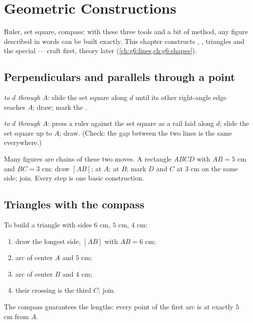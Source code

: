 \chapter{Geometric Constructions}\label{ch:g5:geometry}

Ruler, set square, compass: with these three tools and a bit of
method, any figure described in words can be built exactly. This
chapter constructs , , triangles and the
special  --- craft first, theory later
(\cref{ch:g6:lines,ch:g6:shapes}).

\section{Perpendiculars and parallels through a point}

\begin{method}\label{met:g5:geometry:basic}
\emph{ to $d$ through $A$}: slide the set square along
$d$ until its other right-angle edge reaches $A$; draw; mark the
.

\emph{ to $d$ through $A$}: press a ruler against the set
square as a rail laid along $d$; slide the set square up to $A$;
draw. (Check: the gap between the two lines is the same
everywhere.)
\end{method}

\begin{example}\label{ex:g5:geometry:chain}
Many figures are chains of these two moves. A rectangle $ABCD$ with
$AB = 5$ cm and $BC = 3$ cm: draw $[AB]$;  at $A$;
 at $B$; mark $D$ and $C$ at $3$ cm on the same side;
join. Every step is one basic construction.
\end{example}

\section{Triangles with the compass}

\begin{method}\label{met:g5:geometry:triangle}
To build a triangle with sides $6$ cm, $5$ cm, $4$ cm:
\begin{enumerate}
  \item draw the longest side, $[AB]$ with $AB = 6$ cm;
  \item arc of center $A$ and  $5$ cm;
  \item arc of center $B$ and  $4$ cm;
  \item their crossing is the third  $C$; join.
\end{enumerate}
The compass guarantees the lengths: every point of the first arc is
at exactly $5$ cm from $A$.
\end{method}

